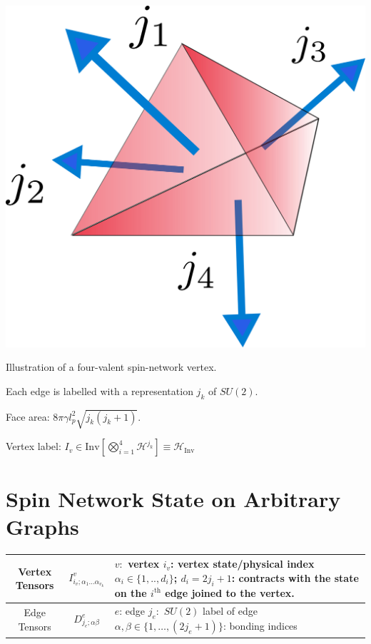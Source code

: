\documentclass[a0,portrait]{a0poster}
\newcommand{\mc}[1]{\mathcal{#1}}
\begin{document}
\begin{multicols}{3}
\begin{minipage}[m]{0.45\linewidth}
	\centering
	\includegraphics[width=0.6\linewidth]{spin-net-vertex}
\end{minipage}
\begin{minipage}[m]{0.45\linewidth}
	\small
	Illustration of a four-valent spin-network vertex.
	
	Each edge is labelled with a representation $ j_k $ of $ SU(2) $.
	
	Face area: $ 8\pi\gamma l_p^2 \sqrt{j_k (j_k + 1)} $.
	
	Vertex label: $ I_v \in \text{Inv}\left[\bigotimes_{i=1}^{4} \mc{H}^{j_k} \right] \equiv \mc{H}_{\text{Inv}}$
\end{minipage}

\vspace*{1cm}

\section*{Spin Network State on Arbitrary Graphs}

\begin{center}
	\begin{tabular}{|c|c|p{14cm}|}
		\toprule
		Vertex Tensors & $ I^v_{i_v; \alpha_1 \ldots \alpha_{v_k}} $ & $ v: $ vertex \newline $i_v$: vertex state/physical index \newline $\alpha_i \in \{ 1,..,d_i \} $; $ d_i = 2 j_i + 1 $: contracts with the state on the $ i^\text{th} $ edge joined to the vertex. \\
		\midrule
		Edge Tensors & $ D^e_{j_e; \alpha\beta} $ &  $ e $: edge \newline $j_e:$ $ SU(2) $ label of edge \newline $\alpha, \beta \in \{1,\ldots,(2 j_e + 1) \} $: bonding indices \\
		\bottomrule
	\end{tabular}
\end{center}


\end{multicols}
\end{document}
